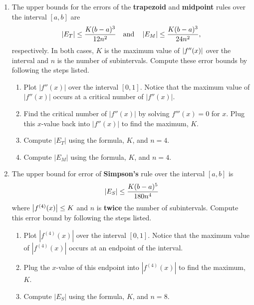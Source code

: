 \begin{enumerate}
    \item The upper bounds for the errors of the \textbf{trapezoid} and \textbf{midpoint} rules over the interval $[a,b]$ are 
    \[\left|E_T\right|\le\dfrac{K(b-a)^3}{12n^2} \quad\text{and}\quad \left|E_M\right|\le\dfrac{K(b-a)^3}{24n^2},\] respectively. In both cases, $K$ is the maximum value of $\left|f''(x)\right|$ over the interval and $n$ is the number of subintervals. Compute these error bounds by following the steps listed.
    \begin{enumerate}
        \item Plot $|f''(x)|$ over the interval $[0,1]$. Notice that the maximum value of $|f''(x)|$ occurs at a critical number of $|f''(x)|$.
        \item Find the critical number of $|f''(x)|$ by solving $f'''(x)=0$ for $x$. Plug this $x$-value back into $|f''(x)|$ to find the maximum, $K$.
        \item Compute $|E_T|$ using the formula, $K$, and $n=4$.
        \item Compute $|E_M|$ using the formula, $K$, and $n=4$.
    \end{enumerate}
    \item  The upper bound for error of \textbf{Simpson's} rule over the interval $[a,b]$ is \[\left|E_S\right|\le\dfrac{K(b-a)^5}{180n^4}\] where $\left|f^{(4)}(x)\right|\le K$ and $n$ is \textbf{twice} the number of subintervals. Compute this error bound by following the steps listed.
    \begin{enumerate}
        \item Plot $|f^{(4)}(x)|$ over the interval $[0,1]$. Notice that the maximum value of $|f^{(4)}(x)|$ occurs at an endpoint of the interval.
        \item Plug the $x$-value of this endpoint into $|f^{(4)}(x)|$ to find the maximum, $K$.
        \item Compute $|E_S|$ using the formula, $K$, and $n=8$.
    \end{enumerate}
\end{enumerate}
